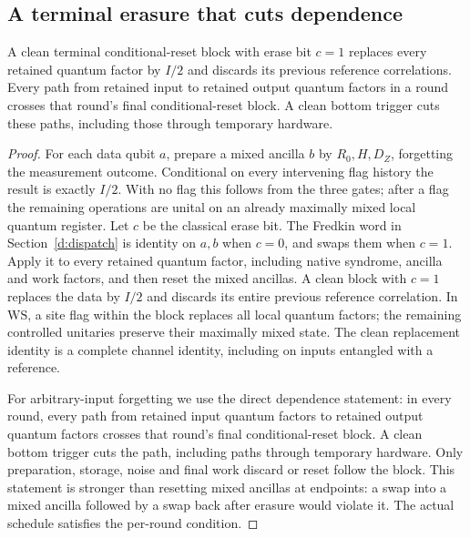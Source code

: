 \subsection{A terminal erasure that cuts dependence}\label{s:terminal-erasure}
\begin{lemma}\label{d:complete-cut}
A clean terminal conditional-reset block with erase bit \(c=1\) replaces every retained quantum factor by \(I/2\) and discards its previous reference correlations. Every path from retained input to retained output quantum factors in a round crosses that round's final conditional-reset block. A clean bottom trigger cuts these paths, including those through temporary hardware.
\end{lemma}
\begin{proof}

For each data qubit \(a\), prepare a mixed ancilla \(b\) by \(R_0,H,D_Z\),
forgetting the measurement outcome. Conditional on every intervening
flag history the result is exactly \(I/2\). With no flag this follows
from the three gates; after a flag the remaining operations are unital
on an already maximally mixed local quantum register.
Let \(c\) be the classical erase bit. The Fredkin word in Section~\ref{d:dispatch}
is identity on \(a,b\) when \(c=0\), and swaps them when \(c=1\).
Apply it to every retained quantum factor, including native syndrome,
ancilla and work factors, and then reset the mixed ancillas.
A clean block with \(c=1\) replaces the data by \(I/2\) and discards
its entire previous reference correlation. In \(\mathrm{WS}\), a site flag within the
block replaces all local quantum factors; the remaining controlled
unitaries preserve their maximally mixed state. The clean replacement identity is a complete channel identity,
including on inputs entangled with a reference.

For arbitrary-input forgetting we use the direct dependence statement:
in every round, every path from retained input quantum factors to
retained output quantum factors crosses that round's final conditional-reset
block. A clean bottom trigger cuts the path, including paths through
temporary hardware. Only preparation, storage, noise and final
work discard or reset follow the block. This statement is stronger than
resetting mixed ancillas at endpoints: a swap into a mixed ancilla followed by a
swap back after erasure would violate it. The actual schedule satisfies
the per-round condition.
\end{proof}


